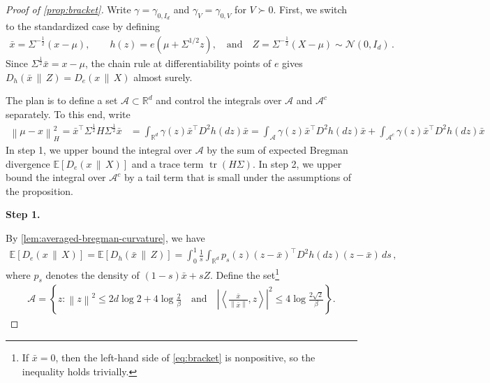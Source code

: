 \documentclass[11pt]{article}
\newcommand{\proofstepinline}[1]{%
    {\sffamily\bfseries\color{blue!55!black}Step #1.}\enspace
}
\newcommand{\R}{\mathbb R}
\newcommand{\E}{\mathbb E}
\newcommand{\N}{\mathcal N}
\newcommand{\tr}{\operatorname{tr}}
\newcommand{\1}{\mathbf 1}
\newcommand{\ip}[2]{\left\langle #1,#2\right\rangle}
\newcommand{\norm}[1]{\left\lVert #1\right\rVert}
\newcommand{\normm}[2]{\left\lVert #1\right\rVert_{#2}}
\begin{document}
\begin{proof}[Proof of \cref{prop:bracket}]
    Write $\gamma=\gamma_{0,I_d}$ and $\gamma_V=\gamma_{0,V}$ for $V\succ0$.
    First, we switch to the standardized case by defining
    \begin{align}
        \bar{x}=\Sigma^{-\frac12}(x-\mu),
        \qquad
        h(z)=e(\mu+\Sigma^{1/2}z),
        \quad\text{and}
        \quad
        Z=\Sigma^{-\frac12}(X - \mu) \sim \N(0,I_d)\,.
    \end{align}
    Since $\Sigma^{\frac12}\bar{x}=x-\mu$, the chain rule at
    differentiability points of $e$ gives
    $D_h(\bar{x}\,\|\,Z)=D_e(x\,\|\,X)$
    almost surely.

    The plan is to define a set $\mathcal A\subset \R^d$ and control the integrals over $\mathcal A$ and $\mathcal A^c$ separately.
    To this end, write
    \begin{align}
        \normm{\mu-x}{H}^2
        =
        \bar{x}^\top \Sigma^{\frac12}H\Sigma^{\frac12}\bar{x}
         & =
        \int_{\R^d}\gamma(z)\bar{x}^\top D^2h(dz)\bar{x}
        =
        \int_{\mathcal A}\gamma(z)\bar{x}^\top D^2h(dz)\bar{x}
        +
        \int_{\mathcal A^c}\gamma(z)\bar{x}^\top D^2h(dz)\bar{x}
        \label{eq:standardized-comparator-curvature}
    \end{align}
    In step 1, we upper bound the integral over $\mathcal A$ by the sum of expected Bregman divergence $\E[D_e(x\,\|\,X)]$ and a trace term $\tr(H\Sigma)$.
    In step 2, we upper bound the integral over $\mathcal A^c$ by a tail term that is small under the assumptions of the proposition.

    \proofstepinline{1}
    By \cref{lem:averaged-bregman-curvature}, we have
    \begin{align}
        \E[D_e(x\,\|\,X)]
        =
        \E[D_h(\bar{x}\,\|\,Z)]
        =
        \int_0^1\frac1s
        \int_{\R^d}
        p_s(z)(z-\bar{x})^\top D^2h(dz)(z-\bar{x})\,ds\,,
        \label{eq:bregman-density}
    \end{align}
    where $p_s$ denotes the density of $(1-s)\bar{x}+sZ$.
    Define the set\footnote{
        If $\bar{x}=0$, then the left-hand side of \eqref{eq:bracket} is nonpositive, so the inequality holds trivially.
    }
    \begin{align}
        \mathcal A=\left\{z:
        \norm{z}^2\leq2d\log2+4\log\frac2\beta
        \quad
        \text{and}
        \quad
        \left|\ip{\frac{\bar{x}}{\norm{\bar{x}}}}{z}\right|^2
        \leq4\log\frac{2\sqrt2}{\beta}
        \right\}.
        \label{eq:A}
    \end{align}


\end{proof}
\end{document}

